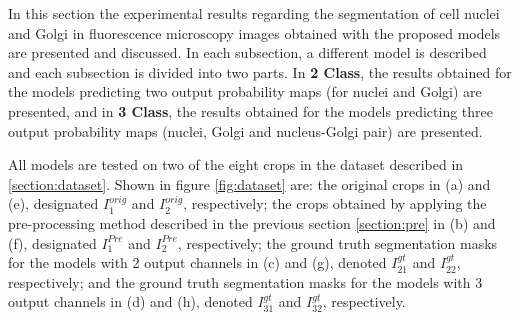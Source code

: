 In this section the experimental results regarding the segmentation of cell nuclei and Golgi in fluorescence microscopy images obtained with the proposed models are presented and discussed. In each subsection, a different model is described and each subsection is divided into two parts. In \textbf{2 Class}, the results obtained for the models predicting two output probability maps (for nuclei and Golgi) are presented, and in \textbf{3 Class}, the results obtained for the models predicting three output probability maps (nuclei, Golgi and nucleus-Golgi pair) are presented.

All models are tested on two of the eight crops in the dataset described in \ref{section:dataset}. Shown in figure \ref{fig:dataset} are: the original crops in (a) and (e), designated $I^{orig}_1$ and $I^{orig}_2$, respectively; the crops obtained by applying the pre-processing method described in the previous section \ref{section:pre} in (b) and (f), designated $I^{Pre}_1$ and $I^{Pre}_2$, respectively; the ground truth segmentation masks for the models with 2 output channels in (c) and (g), denoted $I^{gt}_{21}$ and $I^{gt}_{22}$, respectively; and the ground truth segmentation masks for the models with 3 output channels in (d) and (h), denoted $I^{gt}_{31}$ and $I^{gt}_{32}$, respectively.

